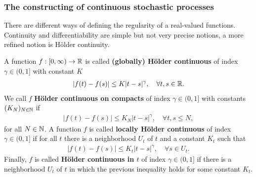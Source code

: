 \subsubsection{The constructing of continuous stochastic processes}
There are different ways of defining the regularity of a real-valued functions. Continuity and differentiability are simple but not very precise notions, a more refined notion is H\"older continuity. 
\begin{ldef}
	\begin{deff}
		A function $f:[0,\infty)\to\mathbb{R}$ is called \textbf{(globally) H\"older continuous} of index $\gamma\in (0,1]$ with constant $K$
		\begin{align*}
			|f(t)-f(s)|\leq K |t-s|^\gamma,\quad \forall t,s\in\mathbb{R}.
		\end{align*}
		We call $f$ \textbf{H\"older continuous on compacts} of index $\gamma\in (0,1]$ with constants $(K_N)_{N\in\mathbb{N}}$ if 
		\begin{align*}
			|f(t)-f(s)|\leq K_N |t-s|^\gamma,\quad \forall t,s\leq N,
		\end{align*}
		for all $N\in \mathbb{N}$. A function $f$ is called \textbf{locally H\"older continuous} of index $\gamma\in (0,1]$ if for all $t$ there is a neighborhood $U_t$ of $t$ and a constant $K_t$ such that 
		\begin{align*}
			|f(t)-f(s)|\leq K_t |t-s|^\gamma,\quad \forall s\in U_t.
		\end{align*}
		Finally, $f$ is called \textbf{H\"older continuous in $t$} of index $\gamma\in (0,1]$ if there is a neighborhood $U_t$ of $t$ in which the previous inequality holds for some constant $K_t$.
	\end{deff}
\end{ldef}
